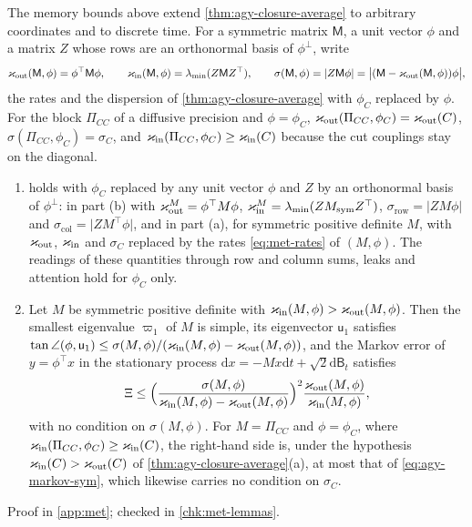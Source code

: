 The memory bounds above extend \cref{thm:agy-closure-average} to arbitrary coordinates and to discrete time. For a symmetric matrix $\mathsf M$, a unit vector $\phi$ and a matrix $Z$ whose rows are an orthonormal basis of $\phi^\perp$, write
\begin{equation}\label{eq:met-rates}
\varkappa_{\mathrm{out}}(\mathsf M,\phi)=\phi^\top\mathsf M\phi,\qquad\varkappa_{\mathrm{in}}(\mathsf M,\phi)=\lambda_{\min}(Z\mathsf MZ^\top),\qquad\sigma(\mathsf M,\phi)=\lvert Z\mathsf M\phi\rvert=\bigl\lvert(\mathsf M-\varkappa_{\mathrm{out}}(\mathsf M,\phi))\phi\bigr\rvert,
\end{equation}
the rates and the dispersion of \cref{thm:agy-closure-average} with $\phi_C$ replaced by $\phi$. For the block $\Pi_{CC}$ of a diffusive precision and $\phi=\phi_C$, $\varkappa_{\mathrm{out}}(\Pi_{CC},\phi_C)=\varkappa_{\mathrm{out}}(C)$, $\sigma(\Pi_{CC},\phi_C)=\sigma_C$, and $\varkappa_{\mathrm{in}}(\Pi_{CC},\phi_C)\ge\varkappa_{\mathrm{in}}(C)$ because the cut couplings stay on the diagonal.

\begin{lemma}\label{lem:met-unit-coordinate}
\begin{enumerate}
\item[(a)]  holds with $\phi_C$ replaced by any unit vector $\phi$ and $Z$ by an orthonormal basis of $\phi^\perp$: in part (b) with $\varkappa_{\mathrm{out}}^M=\phi^\top M\phi$, $\varkappa_{\mathrm{in}}^M=\lambda_{\min}(ZM_{\mathrm{sym}}Z^\top)$, $\sigma_{\mathrm{row}}=\lvert ZM\phi\rvert$ and $\sigma_{\mathrm{col}}=\lvert ZM^\top\phi\rvert$, and in part (a), for symmetric positive definite $M$, with $\varkappa_{\mathrm{out}}$, $\varkappa_{\mathrm{in}}$ and $\sigma_C$ replaced by the rates \eqref{eq:met-rates} of $(M,\phi)$. The readings of these quantities through row and column sums, leaks and attention hold for $\phi_C$ only.
\item[(b)] Let $M$ be symmetric positive definite with $\varkappa_{\mathrm{in}}(M,\phi)>\varkappa_{\mathrm{out}}(M,\phi)$. Then the smallest eigenvalue $\varpi_1$ of $M$ is simple, its eigenvector $\mathsf u_1$ satisfies $\tan\angle(\phi,\mathsf u_1)\le\sigma(M,\phi)/(\varkappa_{\mathrm{in}}(M,\phi)-\varkappa_{\mathrm{out}}(M,\phi))$, and the Markov error of $y=\phi^\top x$ in the stationary process $\mathrm dx=-Mx\mathrm dt+\sqrt2\mathrm d\mathsf B_t$ satisfies
\begin{equation}\label{eq:met-unit-markov}
\Xi\le\Bigl(\frac{\sigma(M,\phi)}{\varkappa_{\mathrm{in}}(M,\phi)-\varkappa_{\mathrm{out}}(M,\phi)}\Bigr)^2\frac{\varkappa_{\mathrm{out}}(M,\phi)}{\varkappa_{\mathrm{in}}(M,\phi)},
\end{equation}
with no condition on $\sigma(M,\phi)$. For $M=\Pi_{CC}$ and $\phi=\phi_C$, where $\varkappa_{\mathrm{in}}(\Pi_{CC},\phi_C)\ge\varkappa_{\mathrm{in}}(C)$, the right-hand side is, under the hypothesis $\varkappa_{\mathrm{in}}(C)>\varkappa_{\mathrm{out}}(C)$ of \cref{thm:agy-closure-average}(a), at most that of \eqref{eq:agy-markov-sym}, which likewise carries no condition on $\sigma_C$.
\end{enumerate}
\end{lemma}
Proof in \cref{app:met}; checked in \cref{chk:met-lemmas}.

